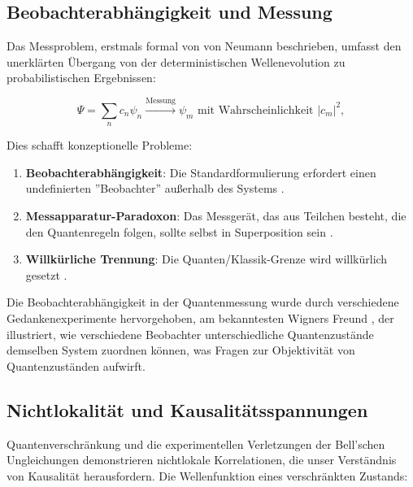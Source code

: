 \documentclass[12pt,a4paper]{article}
\begin{document}
	\subsection{Beobachterabhängigkeit und Messung}
	\label{subsec:observer_dependence}
	
	Das Messproblem, erstmals formal von von Neumann \cite{vonNeumann1932} beschrieben, umfasst den unerklärten Übergang von der deterministischen Wellenevolution zu probabilistischen Ergebnissen:
	
	\begin{equation}
		\Psi = \sum_n c_n \psi_n \xrightarrow{\text{Messung}} \psi_m \text{ mit Wahrscheinlichkeit } |c_m|^2,
		\label{eq:collapse}
	\end{equation}
	
	Dies schafft konzeptionelle Probleme:
	
	\begin{enumerate}
		\item \textbf{Beobachterabhängigkeit}: Die Standardformulierung erfordert einen undefinierten ''Beobachter'' außerhalb des Systems \cite{Wheeler1983, Wigner1967}.
		
		\item \textbf{Messapparatur-Paradoxon}: Das Messgerät, das aus Teilchen besteht, die den Quantenregeln folgen, sollte selbst in Superposition sein \cite{vonNeumann1932, Wigner1963}.
		
		\item \textbf{Willkürliche Trennung}: Die Quanten/Klassik-Grenze wird willkürlich gesetzt \cite{deBroglie1930, Bohm1952, Bell1987}.
	\end{enumerate}
	
	Die Beobachterabhängigkeit in der Quantenmessung wurde durch verschiedene Gedankenexperimente hervorgehoben, am bekanntesten Wigners Freund \cite{Wigner1967}, der illustriert, wie verschiedene Beobachter unterschiedliche Quantenzustände demselben System zuordnen können, was Fragen zur Objektivität von Quantenzuständen aufwirft.
	
	\subsection{Nichtlokalität und Kausalitätsspannungen}
	\label{subsec:nonlocality}
	
	Quantenverschränkung und die experimentellen Verletzungen der Bell'schen Ungleichungen \cite{Bell1964, Aspect1982, Hensen2015} demonstrieren nichtlokale Korrelationen, die unser Verständnis von Kausalität herausfordern. Die Wellenfunktion eines verschränkten Zustands:
	
\end{document}

